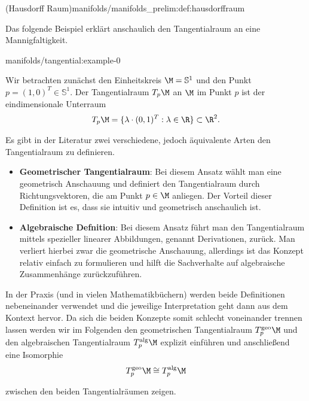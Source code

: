 \documentclass[letterpaper,10pt,english]{jupyterBook}
\begin{document}
\begin{definition}{(Hausdorff Raum)}{manifolds/manifolds_prelim:def:hausdorffraum}
\par
Das folgende Beispiel erklärt anschaulich den Tangentialraum an eine Mannigfaltigkeit.
\begin{example}{}{manifolds/tangential:example-0}



\par
Wir betrachten zunächst den Einheitskreis \(\M = \mathbb{S}^1\) und den Punkt \(p = (1, 0)^T \in \mathbb{S}^1\).
Der Tangentialraum \(T_p\M\) an \(\M\) im Punkt \(p\) ist der eindimensionale Unterraum
\begin{align*}
T_p\M = \lbrace \lambda \cdot (0, 1)^T : \lambda \in \R \rbrace \subset \R^2.
\end{align*}\end{example}

\par
Es gibt in der Literatur zwei verschiedene, jedoch äquivalente Arten den Tangentialraum zu definieren.
\begin{itemize}
\item {} 
\par
\textbf{Geometrischer Tangentialraum}: Bei diesem Ansatz wählt man eine geometrisch Anschauung und definiert den Tangentialraum durch Richtungsvektoren, die am Punkt \(p\in\M\) anliegen.
Der Vorteil dieser Definition ist es, dass sie intuitiv und geometrisch anschaulich ist.

\item {} 
\par
\textbf{Algebraische Defnition}: Bei diesem Ansatz führt man den Tangentialraum mittels spezieller linearer Abbildungen, genannt Derivationen, zurück.
Man verliert hierbei zwar die geometrische Anschauung, allerdings ist das Konzept relativ einfach zu formulieren und hilft die Sachverhalte auf algebraische Zusammenhänge zurückzuführen.

\end{itemize}

\par
In der Praxis (und in vielen Mathematikbüchern) werden beide Definitionen nebeneinander verwendet und die jeweilige Interpretation geht dann aus dem Kontext hervor.
Da sich die beiden Konzepte somit schlecht voneinander trennen lassen werden wir im Folgenden den geometrischen Tangentialraum \(T^{\text{geo}}_p\M\) und den algebraischen Tangentialraum \(T^{\text{alg}}_p\M\) explizit einführen und anschließend eine Isomorphie
\begin{align*}
T^{\text{geo}}_p\M\cong T^{\text{alg}}_p\M
\end{align*}
\par
zwischen den beiden Tangentialräumen zeigen.


\end{definition}
\end{document}
